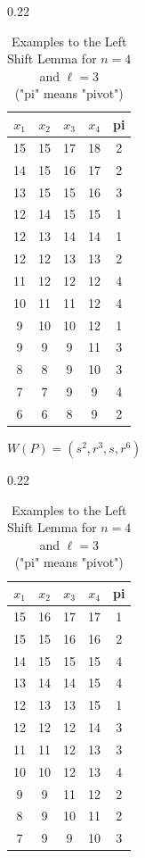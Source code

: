 \documentclass[10pt]{article}
\theoremstyle{definition}
\begin{document}
\begin{table}[h] %
\setlength\tabcolsep{0pt} %
\small %

\caption{Examples to the Left Shift Lemma for $n=4$ and  $\ell = 3$\\ ("pi" means "pivot")} 
\label{tab:4subt}

\begin{subtable}{0.22\textwidth}
\begin{tabular*}{\linewidth}{@{\extracolsep{\fill}}ccccc}
\toprule
$x_1$ & $x_2$ & $x_3$ & $x_4$  &  pi \\
\midrule
15& 15& 17& 18 & 2  \\
14& 15& 16& 17 & 2  \\
13& 15& 15& 16 & 3  \\
\hline
12& 14& 15& 15 & 1  \\
12& 13& 14& 14 & 1  \\
12& 12& 13& 13 & 2  \\
\hline
11 &12& 12& 12 & 4  \\
10& 11& 11& 12 & 4 \\
9& 10 &10 &12  & 1 \\
\hline
9& 9& 9& 11 & 3  \\
8& 8& 9& 10 & 3 \\
7& 7& 9& 9  & 4 \\
\hline
6& 6& 8 &9 &  2  \\
\bottomrule
\end{tabular*}
\center \scriptsize {$W(P)=(s^2,r^3,s,r^6)$} \label{tab:sub1}
\end{subtable}
\hfill
\begin{subtable}{0.22\textwidth}
\begin{tabular*}{\linewidth}{@{\extracolsep{\fill}}ccccc}
\toprule
$x_1$ & $x_2$ & $x_3$ & $x_4$  &  pi\\
\midrule
15& 16& 17& 17 & 1 \\
15& 15& 16& 16 & 2 \\
14& 15& 15& 15 & 4 \\ 
\hline
13& 14& 14& 15& 4 \\
12& 13& 13& 15& 1\\ 
12& 12& 12& 14& 3\\
\hline
11& 11& 12& 13& 3\\  
10& 10& 12& 13& 4\\
9 & 9& 11& 12& 2\\
\hline
8 &9 &10 &11 & 2\\ 
7 &9 &9 &10 & 3\\

\end{tabular*}
\end{subtable}
\end{table}
\end{document}
